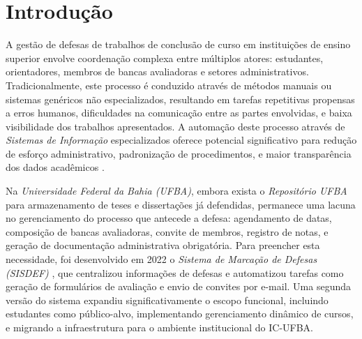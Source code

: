 \documentclass[nonacm, sigconf]{acmart}
\begin{document}
\makeatletter
{}
\makeatother


\maketitle

\section{Introdução}
\label{section:intro}

A gestão de defesas de trabalhos de conclusão de curso em instituições de ensino superior envolve coordenação complexa entre múltiplos atores: estudantes, orientadores, membros de bancas avaliadoras e setores administrativos. Tradicionalmente, este processo é conduzido através de métodos manuais ou sistemas genéricos não especializados, resultando em tarefas repetitivas propensas a erros humanos, dificuldades na comunicação entre as partes envolvidas, e baixa visibilidade dos trabalhos apresentados. A automação deste processo através de \textit{Sistemas de Informação} especializados oferece potencial significativo para redução de esforço administrativo, padronização de procedimentos, e maior transparência dos dados acadêmicos \cite{murdick1984information}.

Na \textit{Universidade Federal da Bahia (UFBA)}, embora exista o \textit{Repositório UFBA} para armazenamento de teses e dissertações já defendidas, permanece uma lacuna no gerenciamento do processo que antecede a defesa: agendamento de datas, composição de bancas avaliadoras, convite de membros, registro de notas, e geração de documentação administrativa obrigatória. Para preencher esta necessidade, foi desenvolvido em 2022 o \textit{Sistema de Marcação de Defesas (SISDEF)} \cite{gabrieltcc}, que centralizou informações de defesas e automatizou tarefas como geração de formulários de avaliação e envio de convites por e-mail. Uma segunda versão do sistema \cite{sisdef2} expandiu significativamente o escopo funcional, incluindo estudantes como público-alvo, implementando gerenciamento dinâmico de cursos, e migrando a infraestrutura para o ambiente institucional do IC-UFBA.
\end{document}
